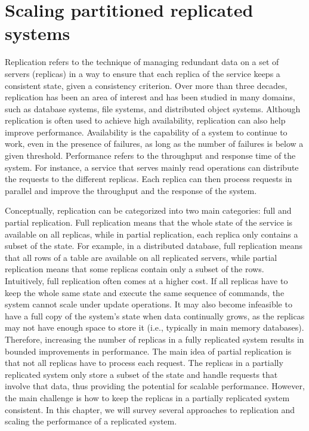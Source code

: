 \chapter[Scaling partitioned replicated systems]{Scaling partitioned replicated systems}

Replication refers to the technique of managing redundant data on a set of
servers (replicas) in a way to ensure that each replica of the service keeps a
consistent state, given a consistency criterion. Over more than three
decades, replication has been an area of interest and has been studied in
many domains, such as database systems, file systems, and 
distributed object systems. Although replication is often used to achieve high
availability, replication can also help improve performance.
Availability is the capability of a system to continue to work, even in the
presence of failures, as long as the number of failures is below a given
threshold. Performance refers to the throughput and response time of the 
system. For instance, a service that serves mainly read operations can distribute the
requests to the different replicas. Each replica can then process requests in
parallel and improve the throughput and the response of the system. 

Conceptually, replication can be categorized into two main categories: full and
partial replication. Full replication means that the whole state of the service
is available on all replicas, while in partial replication, each replica only
contains a subset of the state. For example, in a distributed database, full
replication means that all rows of a table are available on all replicated servers,
while partial replication means that some replicas contain only a subset of the rows.
Intuitively, full replication often comes at a higher cost. If all replicas have
to keep the whole same state and execute the same sequence of commands, the system
cannot scale under update operations. It may also become infeasible to have a full copy of the system's
state when data continually grows, as the replicas may not have enough space to store
it (i.e., typically in main memory databases). Therefore, increasing the number of replicas in a fully replicated system
results in bounded improvements in performance. The main idea
of partial replication is that not all replicas have to process each request. The
replicas in a partially replicated system only store a subset of the state and
handle requests that involve that data, thus providing the potential for scalable performance.
However, the main challenge is how to keep the replicas in a partially replicated system
consistent. In this chapter, we will survey several approaches to replication
and scaling the performance of a replicated system.

